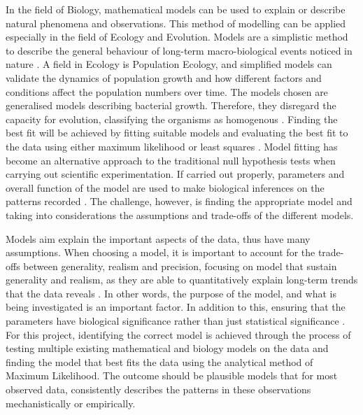 In the field of Biology, mathematical models can be used to explain or describe natural phenomena and observations. This method of modelling can be applied especially in the field of Ecology and Evolution. Models are a simplistic method to describe the general behaviour of long-term macro-biological events noticed in nature \cite{johnson2004model}. A field in Ecology is Population Ecology, and simplified models can validate the dynamics of population growth and how different factors and conditions affect the population numbers over time. The models chosen are generalised models describing bacterial growth. Therefore, they disregard the capacity for evolution, classifying the organisms as homogenous \cite{levins1966strategy}. Finding the best fit will be achieved by fitting suitable models and evaluating the best fit to the data using either maximum likelihood or least squares \cite{johnson2004model}. Model fitting has become an alternative approach to the traditional null hypothesis tests when carrying out scientific experimentation. If carried out properly, parameters and overall function of the model are used to make biological inferences on the patterns recorded \cite{johnson2004model}. The challenge, however, is finding the appropriate model and taking into considerations the assumptions and trade-offs of the different models.

Models aim explain the important aspects of the data, thus have many assumptions. When choosing a model, it is important to account for the trade-offs between generality, realism and precision, focusing on model that sustain generality and realism, as they are able to quantitatively explain long-term trends that the data reveals \cite{levins1966strategy}. In other words, the purpose of the model, and what is being investigated is an important factor. In addition to this, ensuring that the parameters have biological significance rather than just statistical significance \cite{johnson2004model}. For this project, identifying the correct model is achieved through the process of testing multiple existing mathematical and biology models on the data and finding the model that best fits the data using the analytical method of Maximum Likelihood. The outcome should be plausible models that for most observed data, consistently describes the patterns in these observations mechanistically or empirically.

